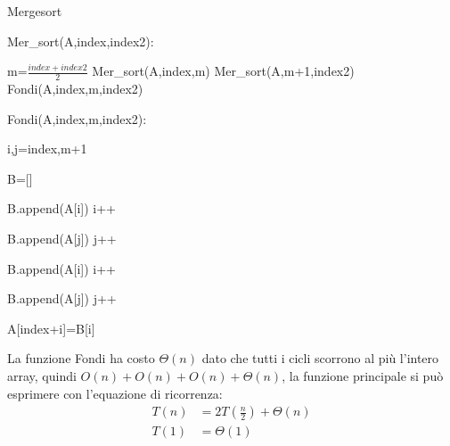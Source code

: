 \documentclass{article}
\begin{document}
\begin{algorithm}[ht]
\caption{Mergesort}
\begin{algorithmic}
\State Mer\_sort(A,index,index2):


        \State m=$\frac{index+index2}{2}$
        \State Mer\_sort(A,index,m)
        \State Mer\_sort(A,m+1,index2)
        \State Fondi(A,index,m,index2)

    \EndIf

\State

\State Fondi(A,index,m,index2): 

    \State i,j=index,m+1

    \State B=[]



            \State B.append(A[i])
            \State i++

        \Else

            \State B.append(A[j])
            \State j++        

        \EndIf

    \EndWhile


        \State B.append(A[i])
        \State i++

    \EndWhile


        \State B.append(A[j])
        \State j++

    \EndWhile


        \State A[index+i]=B[i]

    \EndFor

\end{algorithmic}
\end{algorithm}

\newpage

\noindent La funzione Fondi ha costo $\Theta(n)$ dato che tutti i cicli scorrono al più l'intero array, quindi $O(n)+O(n)+O(n)+\Theta(n)$, la funzione principale si può esprimere con l'equazione di ricorrenza:
\begin{equation}
    \nonumber
    \begin{split}
        T(n)&=2T(\frac{n}{2})+\Theta(n)\\
        T(1)&=\Theta(1)
    \end{split}
\end{equation}\newline
\end{document}
